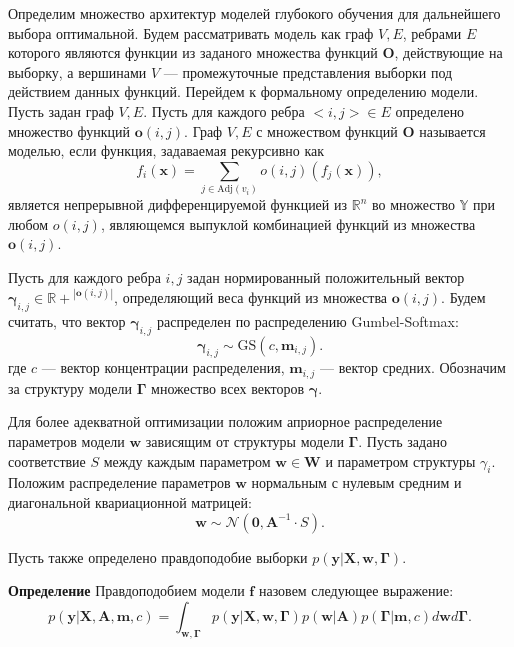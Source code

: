 \documentclass[12pt]{article}
\begin{document}
Определим множество архитектур моделей глубокого обучения для дальнейшего выбора оптимальной. 
Будем рассматривать модель как граф $V,E$, ребрами $E$ которого являются функции из заданого множества функций $\mathbf{O}$, действующие на выборку, а вершинами $V$ --- промежуточные представления выборки под действием данных функций. Перейдем к формальному определению модели.
Пусть задан граф $V,E$. Пусть для каждого ребра $<i,j> \in E$ определено множество функций $\mathbf{o}(i,j)$. Граф $V, E$ с множеством функций $\mathbf{O}$ называется моделью, если функция, задаваемая рекурсивно как 
\[
    f_i(\mathbf{x}) = \sum_{j \in \text{Adj}(v_i)} o(i,j) (f_{j}(\mathbf{x})), 
\]
является непрерывной дифференцируемой функцией из $\mathbb{R}^n$ во множество $\mathbb{Y}$ при любом $o(i,j)$, являющемся выпуклой комбинацией функций из множества $\mathbf{o}(i,j)$.

Пусть для каждого ребра $i,j$ задан нормированный положительный вектор $\boldsymbol{\gamma}_{i,j} \in \mathbb{R+}^{|\mathbf{o}(i,j)|}$, определяющий веса функций из множества $\mathbf{o}(i,j)$.
Будем считать, что вектор $\boldsymbol{\gamma}_{i,j}$ распределен по распределению Gumbel-Softmax:
\[
    \boldsymbol{\gamma}_{i,j}  \sim \text{GS}({c}, \mathbf{m}_{i,j}).
\] 
где $c$ --- вектор концентрации распределения, $\mathbf{m}_{i,j}$ --- вектор средних. Обозначим за структуру модели $\boldsymbol{\Gamma}$ множество всех векторов $\boldsymbol{\gamma}$.

Для более адекватной оптимизации положим априорное распределение параметров модели $\mathbf{w}$ зависящим от структуры модели $\boldsymbol{\Gamma}$.  Пусть задано соответствие $S$ между каждым параметром $\mathbf{w} \in \mathbf{W}$ и параметром структуры $\gamma_i$.
Положим распределение параметров $\mathbf{w}$ нормальным с нулевым средним и диагональной квариационной матрицей:
\[
    \mathbf{w} \sim \mathcal{N}(\mathbf{0}, \mathbf{A}^{-1} \cdot S).
\]


Пусть также определено правдоподобие выборки $p(\mathbf{y}|\mathbf{X}, \mathbf{w}, \boldsymbol{\Gamma}).$

\textbf{Определение} Правдоподобием модели $\mathbf{f}$ назовем следующее выражение: 
\begin{equation}
\label{eq:evidence}
	p(\mathbf{y}|\mathbf{X},\mathbf{A},\mathbf{m}, c) = \int_{\mathbf{w}, \boldsymbol{\Gamma} } p(\mathbf{y}|\mathbf{X},\mathbf{w},  \boldsymbol{\Gamma})p(\mathbf{w}|\mathbf{A})p(\boldsymbol{\Gamma}|\mathbf{m}, c)d\mathbf{w}d\mathbf{\Gamma}.
\end{equation}
\end{document}
